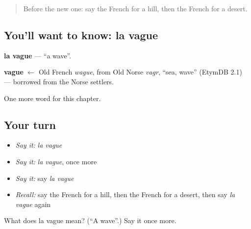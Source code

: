 \begin{quote}
Before the new one: say the French for a hill, then the French for a desert.
\end{quote}

\subsection*{You'll want to know: la vague}
\textbf{la vague} — \textquotedblleft{}a wave\textquotedblright{}.

\begin{cousinweb}
\textbf{vague} $\leftarrow$ Old French \emph{wague}, from Old Norse \emph{vagr}, \textquotedblleft{}sea, wave\textquotedblright{} (EtymDB 2.1) — borrowed from the Norse settlers.
\end{cousinweb}

\begin{grammarlens}[title={What you've built}]
One more word for this chapter.
\end{grammarlens}

\subsection*{Your turn}
\begin{itemize}
\raggedright
  \item \emph{Say it:} \emph{la vague}
  \item \emph{Say it:} \emph{la vague}, once more
  \item \emph{Say it:} say \emph{la vague}
  \item \emph{Recall:} say the French for a hill, then the French for a desert, then say \emph{la vague} again
\end{itemize}

\begin{tcolorbox}[breakable,colback=teal!4,colframe=teal!35!black,title={Before you move on}]
What does la vague mean? (\textquotedblleft{}A wave\textquotedblright{}.) Say it once more.
\end{tcolorbox}
